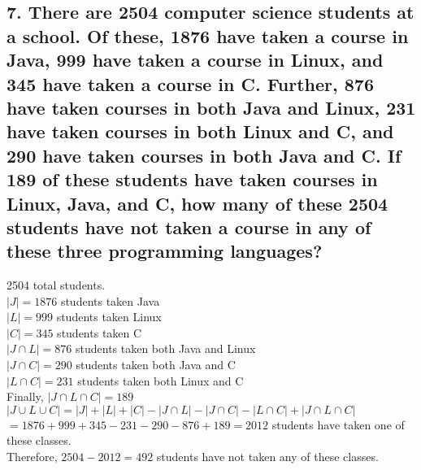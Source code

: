 \documentclass[11pt, oneside]{article} %
\numberwithin{equation}{section} %
\numberwithin{figure}{section} %
\numberwithin{table}{section} %
\begin{document}
\subsection{7. There are 2504 computer science students at a school. Of these, 1876 have taken a course in Java, 999 have taken a course in Linux, and 345 have taken a course in C. Further, 876 have taken courses in both Java and Linux, 231 have taken courses in both Linux and C, and 290 have taken courses in both Java and C. If 189 of these students have taken courses in Linux, Java, and C, how many of these 2504 students have not taken a course in any of these three programming languages?}
2504 total students. \\
$|J| = 1876$ students taken Java \\
$|L| = 999$ students taken Linux \\
$|C| = 345$ students taken C \\
$|J\cap L| =876$ students taken both Java and Linux \\
$|J\cap C| =290$ students taken both Java and C \\
$|L\cap C| =231$ students taken both Linux and C \\
Finally, $|J \cap L \cap C| = 189$ \\
$ |J \cup L \cup C| = |J| + |L| + |C| - |J\cap L| - |J\cap C| - |L\cap C| + |J \cap L \cap C|$\\
$= 1876 + 999 + 345 -231 -290 -876 +189 = 2012$ students have taken one of these classes. \\
Therefore, $2504 - 2012 = 492$ students have not taken any of these classes. 

 

\end{document}

